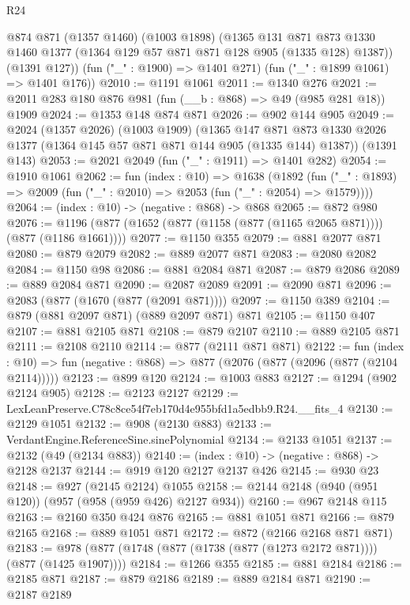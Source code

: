 \begin{lexlean}{R24}
\begin{coremodule}
        @874
        @871
        (@1357 @1460)
        (@1003 @1898)
        (@1365
          @131
          @871
          @873
          @1330
          @1460
          @1377
          (@1364 @129 @57 @871 @871 @128 @905 (@1335 @128) @1387))
        (@1391 @127))
      (fun ("_" : @1900) => @1401 @271)
      (fun ("_" : @1899 @1061) => @1401 @176))
@2010 := @1191 @1061
@2011 := @1340 @276
@2021 := @2011 @283 @180 @876 @981 (fun (__b : @868) => @49 (@985 @281 @18)) @1909
@2024 := @1353 @148 @874 @871
@2026 := @902 @144 @905
@2049 := @2024
    (@1357 @2026)
    (@1003 @1909)
    (@1365 @147 @871 @873 @1330 @2026 @1377 (@1364 @145 @57 @871 @871 @144 @905 (@1335 @144) @1387))
    (@1391 @143)
@2053 := @2021 @2049 (fun ("_" : @1911) => @1401 @282)
@2054 := @1910 @1061
@2062 := fun (index : @10) =>
  @1638
    (@1892 (fun ("_" : @1893) => @2009 (fun ("_" : @2010) => @2053 (fun ("_" : @2054) => @1579))))
@2064 := (index : @10) -> (negative : @868) -> @868
@2065 := @872 @980
@2076 := @1196 (@877 (@1652 (@877 (@1158 (@877 (@1165 @2065 @871)))) (@877 (@1186 @1661))))
@2077 := @1150 @355
@2079 := @881 @2077 @871
@2080 := @879 @2079
@2082 := @889 @2077 @871
@2083 := @2080 @2082
@2084 := @1150 @98
@2086 := @881 @2084 @871
@2087 := @879 @2086
@2089 := @889 @2084 @871
@2090 := @2087 @2089
@2091 := @2090 @871
@2096 := @2083 (@877 (@1670 (@877 (@2091 @871))))
@2097 := @1150 @389
@2104 := @879 (@881 @2097 @871) (@889 @2097 @871) @871
@2105 := @1150 @407
@2107 := @881 @2105 @871
@2108 := @879 @2107
@2110 := @889 @2105 @871
@2111 := @2108 @2110
@2114 := @877 (@2111 @871 @871)
@2122 := fun (index : @10) =>
  fun (negative : @868) => @877 (@2076 (@877 (@2096 (@877 (@2104 @2114)))))
@2123 := @899 @120
@2124 := @1003 @883
@2127 := @1294 (@902 @2124 @905)
@2128 := @2123 @2127
@2129 := LexLeanPreserve.C78c8ce54f7eb170d4e955bfd1a5edbb9.R24.__fits_4
@2130 := @2129 @1051
@2132 := @908 (@2130 @883)
@2133 := VerdantEngine.ReferenceSine.sinePolynomial
@2134 := @2133 @1051
@2137 := @2132 (@49 (@2134 @883))
@2140 := (index : @10) -> (negative : @868) -> @2128 @2137
@2144 := @919 @120 @2127 @2137 @426
@2145 := @930 @23
@2148 := @927 (@2145 @2124) @1055
@2158 := @2144 @2148 (@940 (@951 @120)) (@957 (@958 (@959 @426) @2127 @934))
@2160 := @967 @2148 @115
@2163 := @2160 @350 @424 @876
@2165 := @881 @1051 @871
@2166 := @879 @2165
@2168 := @889 @1051 @871
@2172 := @872 (@2166 @2168 @871 @871)
@2183 := @978 (@877 (@1748 (@877 (@1738 (@877 (@1273 @2172 @871)))) (@877 (@1425 @1907))))
@2184 := @1266 @355
@2185 := @881 @2184
@2186 := @2185 @871
@2187 := @879 @2186
@2189 := @889 @2184 @871
@2190 := @2187 @2189

\end{coremodule}
\end{lexlean}
